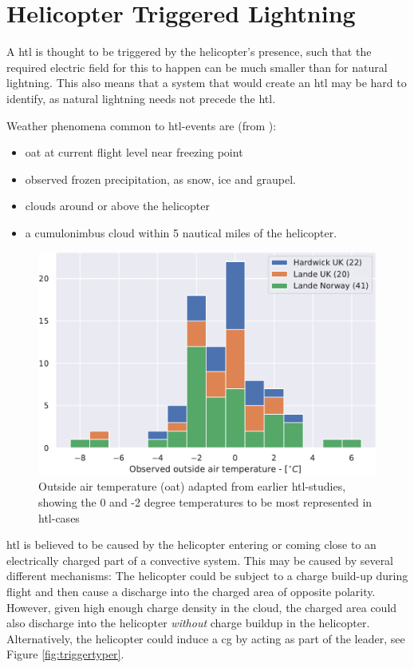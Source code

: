 \section{Helicopter Triggered Lightning}
A \acrlong{htl} is thought to be triggered by the helicopter's presence, such that the required electric field for this to happen can be much smaller than for natural lightning. This also means that a system that would create an \acrshort{htl} may be hard to identify, as natural lightning needs not precede the \acrshort{htl}. 

Weather phenomena common to \acrshort{htl}-events are (from \cite{lande1999}):
\begin{itemize}
 \item \acrfull{oat} at current flight level near freezing point 
 \item observed frozen precipitation, as snow, ice and graupel.
 \item clouds around or above the helicopter
 \item a cumulonimbus cloud within 5 nautical miles of the helicopter.
\end{itemize}

\begin{figure}
    \centering
    \includegraphics[width=\textwidth]{Figures/LandeTemp.pdf}
    \caption{Outside air temperature (\acrshort{oat}) adapted from earlier \acrshort{htl}-studies, showing the 0 and -2 degree temperatures to be most represented in \acrshort{htl}-cases} 
    \label{fig:landetemp}
\end{figure}

\acrshort{htl} is believed to be caused by the helicopter entering or coming close to an electrically charged part of a convective system. This may be caused by several different mechanisms: The helicopter could be subject to a charge build-up during flight and then cause a discharge into the charged area of opposite polarity. However, given high enough charge density in the cloud, the charged area could also discharge into the helicopter \textit{without} charge buildup in the helicopter. Alternatively, the helicopter could induce a \acrshort{cg} by acting as part of the leader, see Figure \ref{fig:triggertyper}. 

